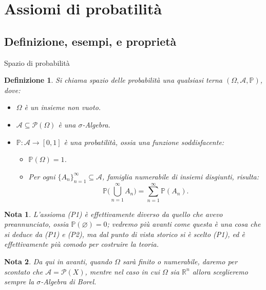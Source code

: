 \documentclass[11pt]{book}
\theoremstyle{Definizione}
\newtheorem*{mydef}{Definizione}
\theoremstyle{TeoremaProposizioneLemmaCorollario}
\theoremstyle{OsservazioneNota}
\newtheorem*{mynota}{Nota}
\newcommand{\R}{\mathbb{R}}
\newcommand{\parti}[1]{\mathcal{P}\left({#1}\right)}
\renewcommand{\P}{\mathbb{P}}
\begin{document}
\section{Assiomi di probatilità}
\subsection{Definizione, esempi, e proprietà}
\begin{boxdef}{Spazio di probabilità}
\begin{mydef}
Si chiama spazio delle probabilità una qualsiasi terna $(\Omega,\mathcal{A},\P)$, dove:
\begin{itemize}
\item $\Omega$ è un insieme non vuoto.
\item $\mathcal{A}\subseteq \parti{\Omega}$ è una $\sigma$-Algebra.
\item $\P:\mathcal{A}\longrightarrow [0,1]$ è una probatilità, ossia una funzione soddisfacente:
\begin{itemize}
\item[\textup{(P1)}] $\P(\Omega) = 1$.
\item[\textup{(P2)}] Per ogni $\{A_n\}_{n = 1}^\infty\subseteq \mathcal{A}$, famiglia numerabile di insiemi disgiunti, risulta:
$$
\P\Bigg(\bigcup_{n = 1}^\infty A_n\Bigg) = \sum_{n = 1}^\infty \P(A_n). 
$$
\end{itemize}
\end{itemize}
\end{mydef}
\end{boxdef}
\begin{mynota}
L'assioma (P1) è effettivamente diverso da quello che avevo preannunciato, ossia $\P(\varnothing) = 0$; vedremo più avanti come questa è una cosa che si deduce da (P1) e (P2), ma dal punto di vista storico si è scelto (P1), ed è effettivamente più comodo per costruire la teoria.
\end{mynota}
\begin{mynota}
Da qui in avanti, quando $\Omega$ sarà finito o numerabile, daremo per scontato che $\mathcal{A} = \parti{X}$, mentre nel caso in cui $\Omega$ sia $\R^n$ allora sceglieremo sempre la $\sigma$-Algebra di Borel.
\end{mynota}
\end{document}
